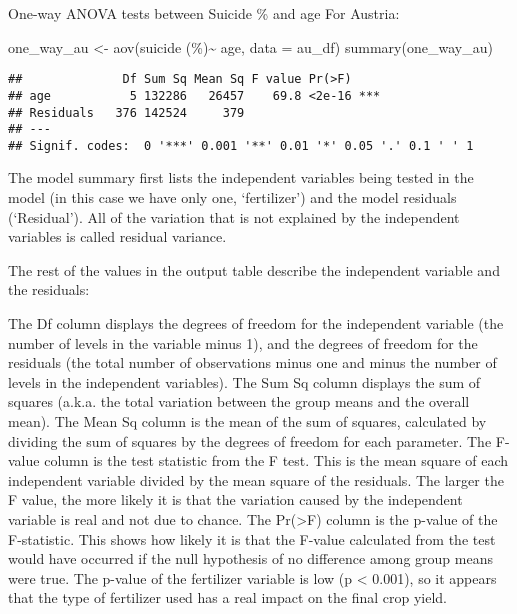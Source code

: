 \documentclass[
]{article}
\newenvironment{Shaded}{\begin{snugshade}}{\end{snugshade}}
\newcommand{\AttributeTok}[1]{\textcolor[rgb]{0.77,0.63,0.00}{#1}}
\newcommand{\FunctionTok}[1]{\textcolor[rgb]{0.00,0.00,0.00}{#1}}
\newcommand{\NormalTok}[1]{#1}
\newcommand{\OtherTok}[1]{\textcolor[rgb]{0.56,0.35,0.01}{#1}}
\newcommand{\SpecialCharTok}[1]{\textcolor[rgb]{0.00,0.00,0.00}{#1}}
\newcommand{\StringTok}[1]{\textcolor[rgb]{0.31,0.60,0.02}{#1}}
\begin{document}
One-way ANOVA tests between Suicide \% and age For Austria:

\begin{Shaded}
\begin{Highlighting}[]
\NormalTok{one\_way\_au }\OtherTok{\textless{}{-}} \FunctionTok{aov}\NormalTok{(}\StringTok{\textasciigrave{}}\AttributeTok{suicide (\%)}\StringTok{\textasciigrave{}}\SpecialCharTok{\textasciitilde{}}\NormalTok{ age, }\AttributeTok{data =}\NormalTok{ au\_df)}
\FunctionTok{summary}\NormalTok{(one\_way\_au)}
\end{Highlighting}
\end{Shaded}

\begin{verbatim}
##              Df Sum Sq Mean Sq F value Pr(>F)    
## age           5 132286   26457    69.8 <2e-16 ***
## Residuals   376 142524     379                   
## ---
## Signif. codes:  0 '***' 0.001 '**' 0.01 '*' 0.05 '.' 0.1 ' ' 1
\end{verbatim}

The model summary first lists the independent variables being tested in
the model (in this case we have only one, `fertilizer') and the model
residuals (`Residual'). All of the variation that is not explained by
the independent variables is called residual variance.

The rest of the values in the output table describe the independent
variable and the residuals:

The Df column displays the degrees of freedom for the independent
variable (the number of levels in the variable minus 1), and the degrees
of freedom for the residuals (the total number of observations minus one
and minus the number of levels in the independent variables). The Sum Sq
column displays the sum of squares (a.k.a. the total variation between
the group means and the overall mean). The Mean Sq column is the mean of
the sum of squares, calculated by dividing the sum of squares by the
degrees of freedom for each parameter. The F-value column is the test
statistic from the F test. This is the mean square of each independent
variable divided by the mean square of the residuals. The larger the F
value, the more likely it is that the variation caused by the
independent variable is real and not due to chance. The
Pr(\textgreater F) column is the p-value of the F-statistic. This shows
how likely it is that the F-value calculated from the test would have
occurred if the null hypothesis of no difference among group means were
true. The p-value of the fertilizer variable is low (p \textless{}
0.001), so it appears that the type of fertilizer used has a real impact
on the final crop yield.
\end{document}

